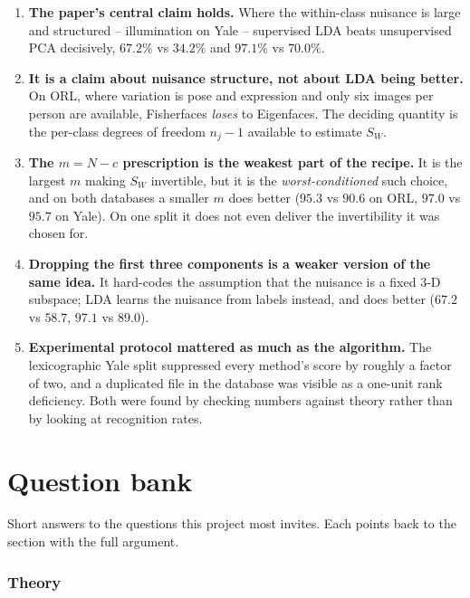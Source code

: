 \documentclass[11pt]{article}
\theoremstyle{definition}
\theoremstyle{remark}
\newcommand{\Sw}{S_W}
\begin{document}
\begin{enumerate}[leftmargin=*]
\item \textbf{The paper's central claim holds.} Where the within-class nuisance is
  large and structured -- illumination on Yale -- supervised LDA beats unsupervised
  PCA decisively, $67.2\%$ vs $34.2\%$ and $97.1\%$ vs $70.0\%$.
\item \textbf{It is a claim about nuisance structure, not about LDA being better.}
  On ORL, where variation is pose and expression and only six images per person are
  available, Fisherfaces \emph{loses} to Eigenfaces. The deciding quantity is the
  per-class degrees of freedom $n_j-1$ available to estimate $\Sw$.
\item \textbf{The $m=N-c$ prescription is the weakest part of the recipe.} It is
  the largest $m$ making $\Sw$ invertible, but it is the \emph{worst-conditioned}
  such choice, and on both databases a smaller $m$ does better ($95.3$ vs $90.6$ on
  ORL, $97.0$ vs $95.7$ on Yale). On one split it does not even deliver the
  invertibility it was chosen for.
\item \textbf{Dropping the first three components is a weaker version of the same
  idea.} It hard-codes the assumption that the nuisance is a fixed 3-D subspace;
  LDA learns the nuisance from labels instead, and does better
  ($67.2$ vs $58.7$, $97.1$ vs $89.0$).
\item \textbf{Experimental protocol mattered as much as the algorithm.} The
  lexicographic Yale split suppressed every method's score by roughly a factor of
  two, and a duplicated file in the database was visible as a one-unit rank
  deficiency. Both were found by checking numbers against theory rather than by
  looking at recognition rates.
\end{enumerate}

\part{Question bank}

Short answers to the questions this project most invites. Each points back to the
section with the full argument.

\section{Theory}
\end{document}

